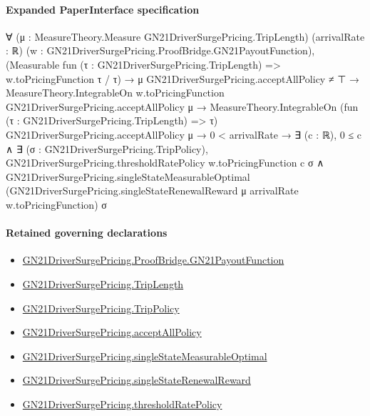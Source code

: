 \documentclass[10pt]{article}
\begin{document}
\paragraph{Expanded PaperInterface specification}
\begin{ReviewVerbatim}
∀ (μ : MeasureTheory.Measure GN21DriverSurgePricing.TripLength) (arrivalRate : ℝ)
  (w : GN21DriverSurgePricing.ProofBridge.GN21PayoutFunction),
  (Measurable fun (τ : GN21DriverSurgePricing.TripLength) => w.toPricingFunction τ / τ) →
    μ GN21DriverSurgePricing.acceptAllPolicy ≠ ⊤ →
      MeasureTheory.IntegrableOn w.toPricingFunction GN21DriverSurgePricing.acceptAllPolicy μ →
        MeasureTheory.IntegrableOn (fun (τ : GN21DriverSurgePricing.TripLength) => τ)
            GN21DriverSurgePricing.acceptAllPolicy μ →
          0 < arrivalRate →
            ∃ (c : ℝ),
              0 ≤ c ∧
                ∃ (σ : GN21DriverSurgePricing.TripPolicy),
                  GN21DriverSurgePricing.thresholdRatePolicy w.toPricingFunction c σ ∧
                    GN21DriverSurgePricing.singleStateMeasurableOptimal
                      (GN21DriverSurgePricing.singleStateRenewalReward μ arrivalRate w.toPricingFunction) σ
\end{ReviewVerbatim}

\paragraph{Retained governing declarations}
\begin{itemize}\raggedright
\item \hyperlink{governing-declaration-a6acf72e095a5e6b}{GN21\allowbreak{}Driver\allowbreak{}Surge\allowbreak{}Pricing.\allowbreak{}Proof\allowbreak{}Bridge.\allowbreak{}GN21\allowbreak{}Payout\allowbreak{}Function}
\item \hyperlink{governing-declaration-a616c143f22cf2bc}{GN21\allowbreak{}Driver\allowbreak{}Surge\allowbreak{}Pricing.\allowbreak{}Trip\allowbreak{}Length}
\item \hyperlink{governing-declaration-4312ad4cb899871f}{GN21\allowbreak{}Driver\allowbreak{}Surge\allowbreak{}Pricing.\allowbreak{}Trip\allowbreak{}Policy}
\item \hyperlink{governing-declaration-e94c9281d4f4b12d}{GN21\allowbreak{}Driver\allowbreak{}Surge\allowbreak{}Pricing.\allowbreak{}accept\allowbreak{}All\allowbreak{}Policy}
\item \hyperlink{governing-declaration-19a00aa92f85cddf}{GN21\allowbreak{}Driver\allowbreak{}Surge\allowbreak{}Pricing.\allowbreak{}single\allowbreak{}State\allowbreak{}Measurable\allowbreak{}Optimal}
\item \hyperlink{governing-declaration-147334ebd6da0a3b}{GN21\allowbreak{}Driver\allowbreak{}Surge\allowbreak{}Pricing.\allowbreak{}single\allowbreak{}State\allowbreak{}Renewal\allowbreak{}Reward}
\item \hyperlink{governing-declaration-5a482c9835ed613f}{GN21\allowbreak{}Driver\allowbreak{}Surge\allowbreak{}Pricing.\allowbreak{}threshold\allowbreak{}Rate\allowbreak{}Policy}
\end{itemize}
\end{document}
